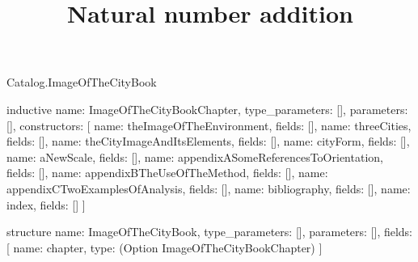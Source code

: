 \begin{lexlean}{Catalog.ImageOfTheCityBook}
\title{Natural number addition}
\begin{semanticmodule}
inductive{
  name: ImageOfTheCityBookChapter,
  type_parameters: [],
  parameters: [],
  constructors: [
    {name: theImageOfTheEnvironment, fields: []},
    {name: threeCities, fields: []},
    {name: theCityImageAndItsElements, fields: []},
    {name: cityForm, fields: []},
    {name: aNewScale, fields: []},
    {name: appendixASomeReferencesToOrientation, fields: []},
    {name: appendixBTheUseOfTheMethod, fields: []},
    {name: appendixCTwoExamplesOfAnalysis, fields: []},
    {name: bibliography, fields: []},
    {name: index, fields: []}
  ]
}

structure{
  name: ImageOfTheCityBook,
  type_parameters: [],
  parameters: [],
  fields: [
    {name: chapter, type: (Option ImageOfTheCityBookChapter)}
  ]
}
\end{semanticmodule}
\end{lexlean}
